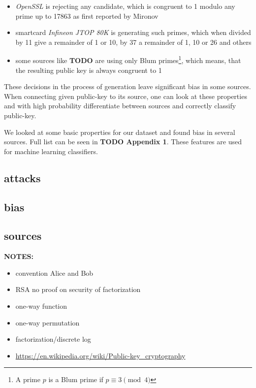 \begin{itemize}

\item \textit{OpenSSL} is rejecting any candidate, which is congruent to 1 modulo any prime up to 17863 as first reported by Mironov \cite{Mironov Svenda1 [20]}

\item smartcard \textit{Infineon JTOP 80K} is generating such primes, which when divided by 11 give a remainder of 1 or 10, by 37 a remainder of 1, 10 or 26 and others

\item some sources like \textbf{TODO} are using only Blum primes\footnote{A prime $p$ is a Blum prime if $p \equiv 3 \pmod{4}$}, which means, that the resulting public key is always congruent to 1

\end{itemize}

These decisions in the process of generation leave significant bias in some sources. When connecting given public-key to its source, one can look at these properties and with high probability differentiate between sources and correctly classify public-key.

We looked at some basic properties for our dataset and found bias in several sources. Full list can be seen in \textbf{TODO Appendix 1}. These features are used for machine learning classifiers.

\subsection*{attacks}
\subsection*{bias}
\subsection*{sources}


\textbf{NOTES:}
\begin{itemize}
\item convention Alice and Bob
\item RSA no proof on security of factorization
\item one-way function
\item one-way permutation
\item factorization/discrete log
\item \url{https://en.wikipedia.org/wiki/Public-key_cryptography}
\end{itemize}

